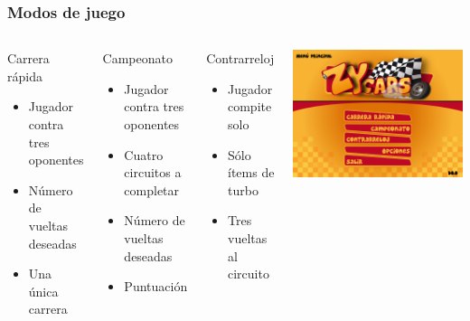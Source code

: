 \begin{frame}
    \frametitle{Modos de juego}

    \begin{columns}

        \column{170px}

        \begin{block}{Carrera rápida}
            \begin{itemize}
                \item Jugador contra tres oponentes
                \item Número de vueltas deseadas
                \item Una única carrera
            \end{itemize}
        \end{block}

        \begin{block}{Campeonato}
            \begin{itemize}
                \item Jugador contra tres oponentes
                \item Cuatro circuitos a completar
                \item Número de vueltas deseadas
                \item Puntuación
            \end{itemize}
        \end{block}

        \begin{block}{Contrarreloj}
            \begin{itemize}
                \item Jugador compite solo
                \item Sólo ítems de turbo
                \item Tres vueltas al circuito
            \end{itemize}
        \end{block}

        \column{130px}
        
        \begin{center}
                \includegraphics[scale=0.17]{imagenes/menuprincipal.png}
        \end{center}


\end{columns}
\end{frame}
